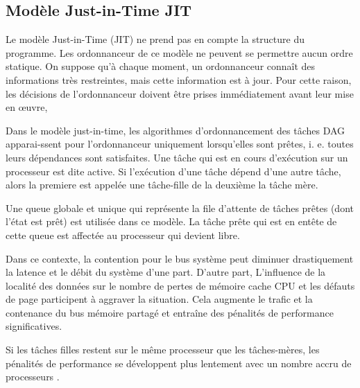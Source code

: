 \subsection{Modèle Just-in-Time JIT}  
%
Le modèle Just-in-Time (JIT) ne prend pas en compte la structure du programme. 
Les ordonnanceur de ce modèle ne peuvent se permettre aucun ordre statique. 
On suppose qu'à chaque moment, un ordonnanceur connaît des informations très restreintes, mais cette information est à jour. 
Pour cette raison, les décisions de l'ordonnanceur doivent être prises immédiatement avant leur mise en œuvre, 

Dans le modèle just-in-time, les algorithmes d'ordonnancement des tâches DAG apparai-ssent pour l'ordonnanceur uniquement lorsqu’elles sont prêtes, i. e. toutes leurs dépendances sont satisfaites. 
Une tâche qui est en cours d'exécution sur un processeur est dite active. 
Si l'exécution d'une tâche dépend d'une autre tâche, alors la premiere est appelée une tâche-fille de la deuxième la tâche mère. 

Une queue globale et unique qui représente la file d'attente de tâches prêtes (dont l'état est prêt) est utilisée dans ce modèle. La tâche prête qui est en  entête de cette queue est affectée au processeur qui devient libre. 

Dans ce contexte, la contention pour le bus système peut diminuer drastiquement la latence et le débit du système \cite{ALL89} d'une part. 
D'autre part, L'influence de la localité des données sur le nombre de pertes de mémoire cache CPU \cite{HL14} et les défauts de page \cite{BLU96} participent à aggraver la situation. 
Cela augmente le trafic et la contenance du bus mémoire partagé et entraîne des pénalités de performance significatives. 

Si les tâches filles restent sur le même processeur que les tâches-mères, les pénalités de performance se développent plus lentement avec un nombre accru de processeurs \cite{SL93}.


